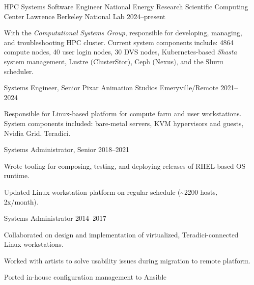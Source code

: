 
\begin{cventries}

  \cventry
  {HPC Systems Software Engineer}
  {National Energy Research Scientific Computing Center}
  {Lawrence Berkeley National Lab}
  {2024--present}
  {
    \begin{cvitems}
    \item{
      With the \textit{Computational Systems Group}, responsible for developing, managing, and troubleshooting HPC cluster.
      Current system components include: 4864 compute nodes, 40 user login nodes, 30 DVS nodes, Kubernetes-based \textit{Shasta} system management, Lustre (ClusterStor), Ceph (Nexus), and the Slurm scheduler.
    }
    \end{cvitems}
  }

  \cventry
  {Systems Engineer, Senior}  %
  {Pixar Animation Studios}  %
  {Emeryville/Remote}  %
  {2021--2024}  %
  {
    \begin{cvitems}  %
    \item{
      Responsible for Linux-based platform for compute farm and user workstations.
      System components included:  bare-metal servers, KVM hypervisors and guests, Nvidia Grid, Teradici.
    }
    \end{cvitems}
  }

  \cventry
  {Systems Administrator, Senior}  %
  {}
  {}
  {2018--2021}  %
  {
    \begin{cvitems}  %
    \item {Wrote tooling for composing, testing, and deploying releases of RHEL-based OS runtime.}
    \item {Updated Linux workstation platform on regular schedule (\textasciitilde{}2200 hosts, 2x/month).}
    \end{cvitems}
  }

  \cventry
  {Systems Administrator}
  {}
  {}
  {2014--2017}
  {
    \begin{cvitems}
    \item {Collaborated on design and implementation of virtualized, Teradici-connected Linux workstations.}
    \item {Worked with artists to solve usability issues during migration to remote platform.}
    \item {Ported in-house configuration management to Ansible}
    \end{cvitems}
  }


\end{cventries}
